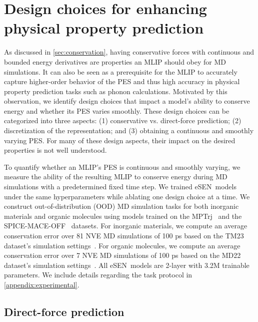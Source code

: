 \documentclass[twocolumn]{fairmeta}
\newcommand{\ourmodel}{eSEN}
\begin{document}
\section{Design choices for enhancing physical property prediction}
\label{sec:design}

As discussed in \cref{sec:conservation}, having conservative forces with continuous and bounded energy derivatives are properties an MLIP should obey for MD simulations. It can also be seen as a prerequisite for the MLIP to accurately capture higher-order behavior of the PES and thus high accuracy in physical property prediction tasks such as phonon calculations. Motivated by this observation, we identify design choices that impact a model's ability to conserve energy and whether its PES varies smoothly. These design choices can be categorized into three aspects: (1) conservative vs. direct-force prediction; (2) discretization of the representation; and (3) obtaining a continuous and smoothly varying PES. For many of these design aspects, their impact on the desired properties is not well understood. 

To quantify whether an MLIP's PES is continuous and smoothly varying, we measure the ability of the resulting MLIP to conserve energy during MD simulations with a predetermined fixed time step. We trained \ourmodel\ models under the same hyperparameters while ablating one design choice at a time. We construct out-of-distribution (OOD) MD simulation tasks for both inorganic materials and organic molecules using models trained on the MPTrj~\citep{jain2013materials, deng2023chgnet} and the SPICE-MACE-OFF~\citep{eastman2023spice, kovacs2023mace} datasets. For inorganic materials, we compute an average conservation error over 81 NVE MD simulations of 100 ps based on the TM23 dataset's simulation settings~\citep{owen2024complexity}. For organic molecules, we compute an average conservation error over 7 NVE MD simulations of 100 ps based on the MD22 dataset's simulation settings~\citep{chmiela2023accurate}.  All \ourmodel\ models are 2-layer with 3.2M trainable parameters. We include details regarding the task protocol in \cref{appendix:experimental}. 

\subsection{Direct-force prediction}
\end{document}
